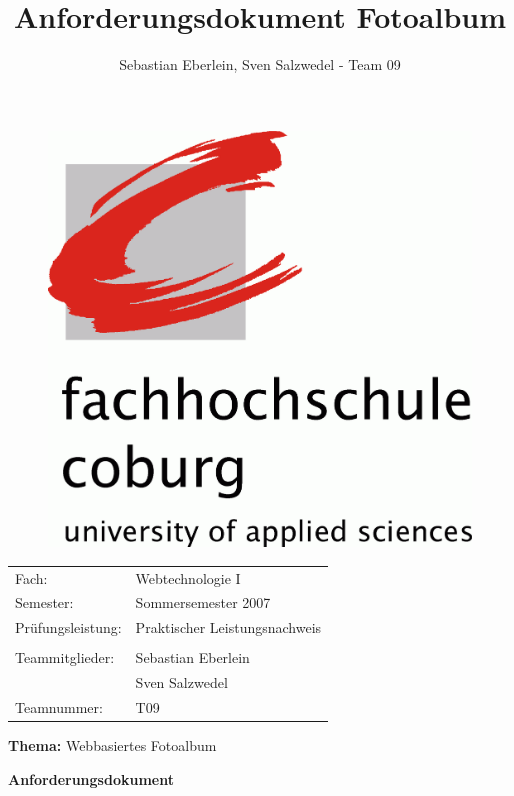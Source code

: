 \documentclass[a4paper,12pt,liststotocnumbered]{scrartcl}
\title{Anforderungsdokument Fotoalbum}
\author{Sebastian Eberlein, Sven Salzwedel - Team 09}
\begin{document}
\begin{figure}[h]
	\begin{center}
		\includegraphics[width=\textwidth/2]{logo}
	\end{center}
\end{figure}

\begin{tabularx}{\textwidth}{lX}
	Fach:&Webtechnologie I\\
	Semester:&Sommersemester 2007\\
	Prüfungsleistung:&Praktischer Leistungsnachweis\\
	&\\
	Teammitglieder:&Sebastian Eberlein\\
	&Sven Salzwedel\\
	Teamnummer:&T09\\
\end{tabularx}

\begin{center}
\end{center}

\begin{center}
	\Large{\textbf{Thema:} Webbasiertes Fotoalbum}\\
\end{center}
\begin{center}
	\Large{\textbf{Anforderungsdokument}}\\
\end{center}
\end{document}
